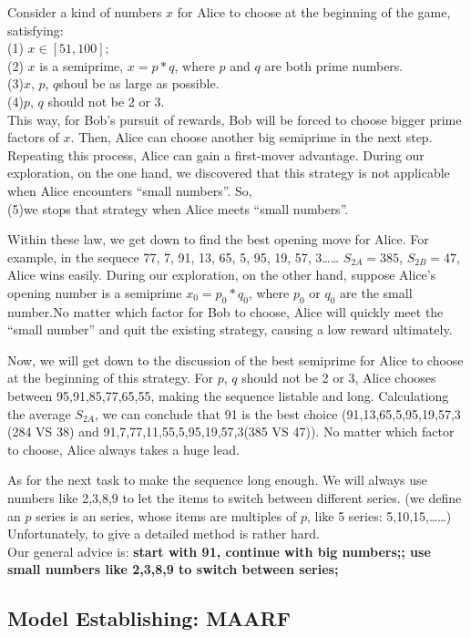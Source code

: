 \documentclass[twocolumn, a4paper]{article}
\begin{document}
Consider a kind of numbers $x$ for Alice to choose at the beginning of the game, satisfying:\\
  (1) $x\in [51,100]$;\\
  (2) $x$ is a semiprime, $x=p*q$, where $p$ and $q$ are both prime numbers. \\
  (3)$x$, $p$, $q$shoul be as large as possible.\\
  (4)$p$, $q$ should not be 2 or 3.\\
This way, for Bob's pursuit of rewards, Bob will be forced to choose bigger prime factors of $x$. Then, Alice can choose another big semiprime in the next step. Repeating this process, Alice can gain a first-mover advantage.
During our exploration, on the one hand, we discovered that this strategy is not applicable when Alice encounters ``small numbers''. So,\\
  (5)we stops that strategy when Alice meets ``small numbers''.

Within these law, we get down to find the best opening move for Alice.
For example, in the sequece 77, 7, 91, 13, 65, 5, 95, 19, 57, 3…… $S_{2A}=385$, $S_{2B}=47$, Alice wins easily. During our exploration, on the other hand, suppose Alice's opening number is a semiprime $x_0=p_0*q_0$, where $p_0$ or $q_0$ are the small number.No matter which factor for Bob to choose, Alice will quickly meet the ``small number'' and quit the existing strategy, causing a low reward ultimately.

Now, we will get down to the discussion of the best semiprime for Alice to choose at the beginning of this strategy. 
For $p$, $q$ should not be 2 or 3, Alice chooses between 95,91,85,77,65,55, making the sequence listable and long. 
Calculationg the average $S_{2A}$, we can conclude that 91 is the best choice (91,13,65,5,95,19,57,3 (284 VS 38) and 91,7,77,11,55,5,95,19,57,3(385 VS 47)). No matter which factor to choose, Alice always takes a huge lead.

As for the next task to make the sequence long enough. We will always use numbers like 2,3,8,9 to let the items to switch between different series. (we define an $p$ series is an series, whose items are multiples of $p$, like 5 series: 5,10,15,……) Unfortunately, to give a detailed method is rather hard. \\
Our general advice is: \textbf{start with 91, continue with big numbers;;
use small numbers like 2,3,8,9 to switch between series;}

\subsection{Model Establishing: MAARF}
\end{document}
